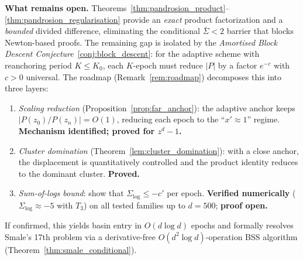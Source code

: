 \documentclass[11pt,a4paper]{article}
\theoremstyle{definition}
\begin{document}
\medskip

\textbf{What remains open.}  Theorems~\ref{thm:pandrosion_product}--\ref{thm:pandrosion_regularisation} provide an \emph{exact} product factorization and a \emph{bounded} divided difference, eliminating the conditional $\bar{\Sigma} < 2$ barrier that blocks Newton-based proofs.  The remaining gap is isolated by the \emph{Amortised Block Descent Conjecture}~\ref{conj:block_descent}: for the adaptive scheme with reanchoring period $K \leq K_0$, each $K$-epoch must reduce $|P|$ by a factor $e^{-c}$ with $c > 0$ universal.  The roadmap (Remark~\ref{rem:roadmap}) decomposes this into three layers:
\begin{enumerate}
  \item \emph{Scaling reduction} (Proposition~\ref{prop:far_anchor}): the adaptive anchor keeps $|P(z_0)/P(z_n)| = O(1)$, reducing each epoch to the ``$x' \approx 1$'' regime.  \textbf{Mechanism identified; proved for $z^d-1$.}
  \item \emph{Cluster domination} (Theorem~\ref{lem:cluster_domination}): with a close anchor, the displacement is quantitatively controlled and the product identity reduces to the dominant cluster.  \textbf{Proved.}
  \item \emph{Sum-of-logs bound}: show that $\Sigma_{\log} \leq -c'$ per epoch.  \textbf{Verified numerically} ($\Sigma_{\log} \approx -5$ with $T_3$) on all tested families up to $d = 500$; \textbf{proof open.}
\end{enumerate}
If confirmed, this yields basin entry in $O(d\log d)$ epochs and formally resolves Smale's 17th problem via a derivative-free $O(d^2\log d)$-operation BSS algorithm (Theorem~\ref{thm:smale_conditional}).

\medskip
\end{document}
